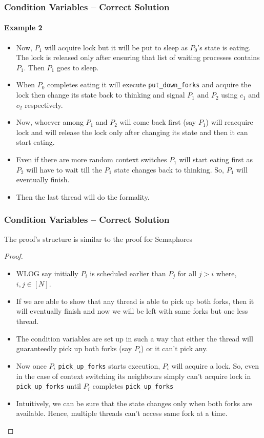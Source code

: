 \documentclass[aspectratio=169, handout, 10pt]{beamer}
\theoremstyle{example}
\begin{document}
\begin{frame}[fragile]\frametitle{Condition Variables -- Correct Solution}\framesubtitle{Example 2}
  \begin{example}[continued]
  \begin{itemize}
  \pause\item Now, $P_1$ will acquire lock but it will be put to sleep as $P_0$'s state is eating. The lock is released only after ensuring that list of waiting processes contains $P_1$. Then $P_1$ goes to sleep.%
  \pause\item When $P_0$ completes eating it will execute \verb!put_down_forks! and acquire the lock then change its state back to thinking and signal $P_1$ and $P_2$ using $c_1$ and $c_2$ respectively.
  \pause\item Now, whoever among $P_1$ and $P_2$ will come back first (say $P_1$) will reacquire lock and will release the lock only after changing its state and then it can start eating.%
  \pause\item Even if there are more random context switches $P_1$ will start eating first as $P_2$ will have to wait till the $P_1$ state changes back to thinking. So, $P_1$ will eventually finish.
  \pause\item Then the last thread will do the formality.
  \end{itemize}
  \end{example}
\end{frame}
\begin{frame}[fragile]\frametitle{Condition Variables -- Correct Solution}%
  The proof's structure is similar to the proof for Semaphores
  \begin{proof}
  \begin{itemize}
  \pause\item WLOG say initially $P_i$ is scheduled earlier than $P_j$ for all $j > i$ where,  $i, j \in [N]$. %
  \pause\item If we are able to show that any thread is able to pick up both forks, then it will eventually finish and now we will be left with same forks but one less thread.
  \pause\item The condition variables are set up in such a way that either the thread will guaranteedly pick up both forks (say $P_i$) or it can't pick any.
  \pause\item Now once $P_i$ \verb!pick_up_forks! starts execution, $P_i$ will acquire a lock. So, even in the case of context switching its neighbours simply can't acquire lock in \verb!pick_up_forks! until $P_i$ completes \verb!pick_up_forks! 
  \pause\item Intuitively, we can be sure that the state changes only when both forks are available. Hence, multiple threads can't access same fork at a time.
  \end{itemize}
\end{proof}
\end{frame}
\end{document}
